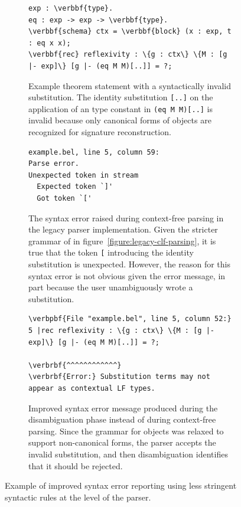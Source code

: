 \begin{figure}[H]
\begin{subfigure}{\linewidth}
\begin{Verbatim}[commandchars=\\\{\}, baselinestretch=1]
exp : \verbbf{type}.
eq : exp -> exp -> \verbbf{type}.
\verbbf{schema} ctx = \verbbf{block} (x : exp, t : eq x x);
\verbbf{rec} reflexivity : \{g : ctx\} \{M : [g |- exp]\} [g |- (eq M M)[..]] = ?;
\end{Verbatim}
\caption{%
Example \Beluga theorem statement with a syntactically invalid substitution.
The identity substitution \texttt{[..]} on the application of an \LF type constant in \texttt{(eq M M)[..]} is invalid because only canonical forms of \LF objects are recognized for signature reconstruction.
}
\end{subfigure}
\par\bigskip
\begin{subfigure}{\linewidth}
\begin{Verbatim}[baselinestretch=1]
example.bel, line 5, column 59:
Parse error.
Unexpected token in stream
  Expected token `]'
  Got token `['
\end{Verbatim}
\caption{%
The syntax error raised during context-free parsing in the legacy parser implementation.
Given the stricter grammar of  in figure~\ref{figure:legacy-clf-parsing}, it is true that the token \texttt{[} introducing the identity substitution is unexpected.
However, the reason for this syntax error is not obvious given the error message, in part because the user unambiguously wrote a substitution.
}
\end{subfigure}
\par\bigskip
\begin{subfigure}{\linewidth}
\begin{Verbatim}[commandchars=\\\{\}, baselinestretch=1]
\verbpbf{File "example.bel", line 5, column 52:}
5 |rec reflexivity : \{g : ctx\} \{M : [g |- exp]\} [g |- (eq M M)[..]] = ?;
                                                      \verbrbf{^^^^^^^^^^^^}
\verbrbf{Error:} Substitution terms may not appear as contextual LF types.
\end{Verbatim}
\caption{%
Improved syntax error message produced during the disambiguation phase instead of during context-free parsing.
Since the grammar for \LF objects was relaxed to support non-canonical forms, the parser accepts the invalid substitution, and then disambiguation identifies that it should be rejected.
}
\end{subfigure}
\caption[Example of improved syntax error reporting]{%
Example of improved syntax error reporting using less stringent syntactic rules at the level of the parser.
}
\label{figure:improved-syntax-error-message}
\end{figure}

